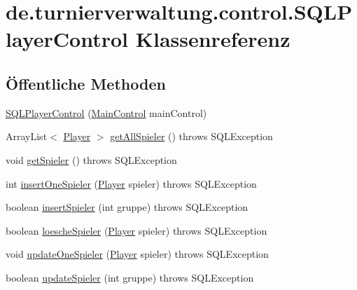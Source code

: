 \hypertarget{classde_1_1turnierverwaltung_1_1control_1_1_s_q_l_player_control}{}\section{de.\+turnierverwaltung.\+control.\+S\+Q\+L\+Player\+Control Klassenreferenz}
\label{classde_1_1turnierverwaltung_1_1control_1_1_s_q_l_player_control}
\subsection*{Öffentliche Methoden}
\begin{DoxyCompactItemize}
\item 
\hyperlink{classde_1_1turnierverwaltung_1_1control_1_1_s_q_l_player_control_a41c716dfbd4bf19c552c8f2743da0138}{S\+Q\+L\+Player\+Control} (\hyperlink{classde_1_1turnierverwaltung_1_1control_1_1_main_control}{Main\+Control} main\+Control)
\item 
Array\+List$<$ \hyperlink{classde_1_1turnierverwaltung_1_1model_1_1_player}{Player} $>$ \hyperlink{classde_1_1turnierverwaltung_1_1control_1_1_s_q_l_player_control_a113d14d3cbc9a499cd2a182725341dfc}{get\+All\+Spieler} ()  throws S\+Q\+L\+Exception 
\item 
void \hyperlink{classde_1_1turnierverwaltung_1_1control_1_1_s_q_l_player_control_a853a874c2aa53f4f41e7070228981275}{get\+Spieler} ()  throws S\+Q\+L\+Exception 
\item 
int \hyperlink{classde_1_1turnierverwaltung_1_1control_1_1_s_q_l_player_control_aab11d808bc6962d5fd4535c39ca8f9db}{insert\+One\+Spieler} (\hyperlink{classde_1_1turnierverwaltung_1_1model_1_1_player}{Player} spieler)  throws S\+Q\+L\+Exception 
\item 
boolean \hyperlink{classde_1_1turnierverwaltung_1_1control_1_1_s_q_l_player_control_a4017e2417df94e39a4e47d0176ab2c0a}{insert\+Spieler} (int gruppe)  throws S\+Q\+L\+Exception 
\item 
boolean \hyperlink{classde_1_1turnierverwaltung_1_1control_1_1_s_q_l_player_control_a96efeba78c1c46243713bf180c9b3100}{loesche\+Spieler} (\hyperlink{classde_1_1turnierverwaltung_1_1model_1_1_player}{Player} spieler)  throws S\+Q\+L\+Exception 
\item 
void \hyperlink{classde_1_1turnierverwaltung_1_1control_1_1_s_q_l_player_control_ab4e44967268d4d22af38222859b137e9}{update\+One\+Spieler} (\hyperlink{classde_1_1turnierverwaltung_1_1model_1_1_player}{Player} spieler)  throws S\+Q\+L\+Exception 
\item 
boolean \hyperlink{classde_1_1turnierverwaltung_1_1control_1_1_s_q_l_player_control_aa97bfc1218c18844f294a292af9a8b7b}{update\+Spieler} (int gruppe)  throws S\+Q\+L\+Exception 
\end{DoxyCompactItemize}


